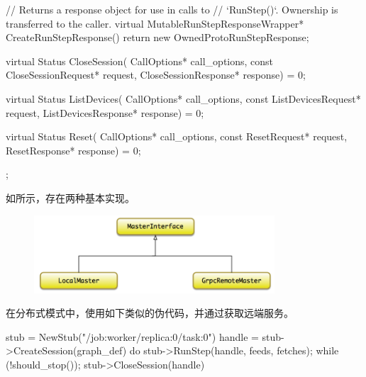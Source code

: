 \begin{content}
\begin{content}
\begin{leftbar}
\begin{c++}
{  // Returns a response object for use in calls to
  // `RunStep()`. Ownership is transferred to the caller.
  virtual MutableRunStepResponseWrapper* CreateRunStepResponse() {
    return new OwnedProtoRunStepResponse;
  }

  virtual Status CloseSession(
    CallOptions* call_options,
    const CloseSessionRequest* request,
    CloseSessionResponse* response) = 0;

  virtual Status ListDevices(
    CallOptions* call_options,
    const ListDevicesRequest* request,
    ListDevicesResponse* response) = 0;

  virtual Status Reset(
    CallOptions* call_options, const ResetRequest* request,
    ResetResponse* response) = 0;
};
\end{c++}
\end{leftbar}

如所示，存在两种基本实现。

\begin{enum}
\end{enum}

\begin{figure}[H]
\centering
\includegraphics[width=0.8\textwidth]{figures/dist-master-interface.png}
\caption{}
 \label{fig:dist-master-interface}
\end{figure}

在分布式模式中，使用如下类似的伪代码，并通过获取远端服务。

\begin{leftbar}
\begin{c++}
stub = NewStub("/job:worker/replica:0/task:0")
handle = stub->CreateSession({graph_def})
do {
  stub->RunStep(handle, feeds, fetches);
} while (!should_stop());
stub->CloseSession({handle})
\end{c++}
\end{leftbar}


\end{content}
\end{content}
